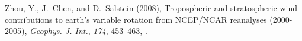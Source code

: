 \documentclass[draft,jgrga]{agutex}
\begin{document}
\begin{article}
\begin{thebibliography}{38}
Zhou, Y., J.~Chen, and D.~Salstein (2008), Tropospheric and stratospheric wind
  contributions to earth's variable rotation from {NCEP/NCAR} reanalyses
  (2000-2005), \textit{Geophys. J. Int.}, \textit{174}, 453--463,
  .

\end{thebibliography}






%

%
%
\end{article}

\newpage
\end{document}
